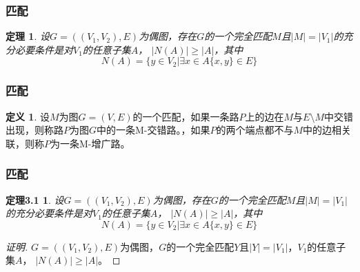 \documentclass{beamer}
\newtheorem{Thm}{定理}[section]
\newtheorem*{Thm3.1}{定理3.1}
\theoremstyle{definition}
\newtheorem{Def}{定义}[section]
\theoremstyle{example}
\begin{document}
\begin{CJK}{UTF8}{gbsn}
\begin{frame}
\end{frame}


\begin{frame}
  \frametitle{匹配}
  \begin{Thm}
    设$G=((V_1,V_2),E)$为偶图，存在$G$的一个完全匹配$M$且$|M| = |V_1|$的充分必要条件是对$V_1$的任意子集$A$， $|N(A)| \geq |A|$，其中\[N(A) = \{y\in V_2|\exists x \in A \{x,y\} \in E\}\]
  \end{Thm}

\end{frame}

\begin{frame}
  \frametitle{匹配}
  \begin{Def}
  设$M$为图$G=(V,E)$的一个匹配，如果一条路$P$上的边在$M$与$E\setminus M$中交错出现，则称路$P$为图$G$中的一条\alert{M-交错路}。，如果$P$的两个端点都不与$M$中的边相关联，则称$P$为一条\alert{M-增广路}。
  \end{Def}
\end{frame}
\begin{frame}
  \frametitle{匹配}
  \begin{Thm3.1}
    设$G=((V_1,V_2),E)$为偶图，存在$G$的一个完全匹配$M$且$|M| = |V_1|$的充分必要条件是对$V_1$的任意子集$A$， $|N(A)| \geq |A|$，其中\[N(A) = \{y\in V_2|\exists x \in A \{x,y\} \in E\}\]
  \end{Thm3.1}\pause
  \begin{proof}[证明]
\justifying\let\raggedright\justifying
{}$G=((V_1,V_2),E)$为偶图，$G$的一个完全匹配$Y$且$|Y| = |V_1|$，$V_1$的任意子集$A$， \pause$|N(A)| \geq |A|$。
    \renewcommand{\qedsymbol}{}    
\end{proof}  
\end{frame}

   

\end{CJK}
\end{document}
